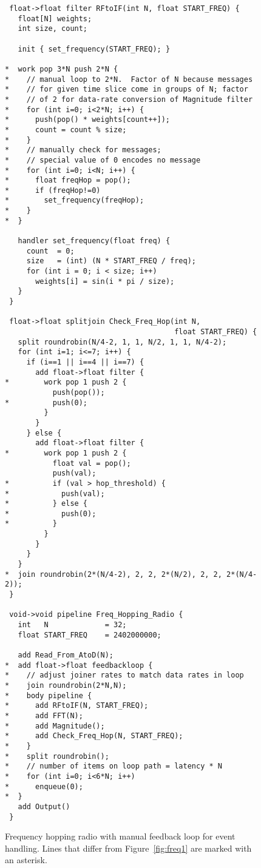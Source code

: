 \begin{figure}[t]
\scriptsize
\begin{verbatim}
 float->float filter RFtoIF(int N, float START_FREQ) {
   float[N] weights;
   int size, count;
   
   init { set_frequency(START_FREQ); }
   
*  work pop 3*N push 2*N {
*    // manual loop to 2*N.  Factor of N because messages 
*    // for given time slice come in groups of N; factor 
*    // of 2 for data-rate conversion of Magnitude filter
*    for (int i=0; i<2*N; i++) {
*      push(pop() * weights[count++]);
*      count = count % size;
*    }
*    // manually check for messages; 
*    // special value of 0 encodes no message
*    for (int i=0; i<N; i++) {
*      float freqHop = pop();
*      if (freqHop!=0)
*        set_frequency(freqHop);
*    }
*  }
   
   handler set_frequency(float freq) {
     count  = 0;
     size   = (int) (N * START_FREQ / freq);
     for (int i = 0; i < size; i++)
       weights[i] = sin(i * pi / size);
   }
 }

 float->float splitjoin Check_Freq_Hop(int N, 
                                       float START_FREQ) {
   split roundrobin(N/4-2, 1, 1, N/2, 1, 1, N/4-2);
   for (int i=1; i<=7; i++) {
     if (i==1 || i==4 || i==7) {
       add float->float filter {
*        work pop 1 push 2 {
           push(pop());
*          push(0);
         }
       }
     } else {
       add float->float filter {
*        work pop 1 push 2 {
           float val = pop();
           push(val);
*          if (val > hop_threshold) {
*            push(val);
*          } else {
*            push(0);
*          }
         }
       }
     }
   }
*  join roundrobin(2*(N/4-2), 2, 2, 2*(N/2), 2, 2, 2*(N/4-2));
 }

 void->void pipeline Freq_Hopping_Radio {
   int   N             = 32;
   float START_FREQ    = 2402000000;
   
   add Read_From_AtoD(N);
*  add float->float feedbackloop {
*    // adjust joiner rates to match data rates in loop
*    join roundrobin(2*N,N);
*    body pipeline {
*      add RFtoIF(N, START_FREQ);
*      add FFT(N);
*      add Magnitude();
*      add Check_Freq_Hop(N, START_FREQ);
*    }
*    split roundrobin();
*    // number of items on loop path = latency * N
*    for (int i=0; i<6*N; i++)
*      enqueue(0);
*  }
   add Output()
 }
\end{verbatim}
\vspace{-12pt}
\caption{\small Frequency hopping radio with manual feedback loop for
event handling.  Lines that differ from Figure~\ref{fig:freq1} are
marked with an asterisk. \protect\label{fig:freq2}}
\end{figure}
\clearpage

